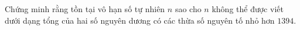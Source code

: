 \ifshowproblem
\begin{problem}\label{example:IRN-2015-MO3-NP1}
	Chứng minh rằng tồn tại vô hạn số tự nhiên $n$ sao cho $n$ không thể được viết
	dưới dạng tổng của hai số nguyên dương có các thừa số nguyên tố nhỏ hơn $1394$.
\end{problem}
\fi

\footnotemark
{}
\fi